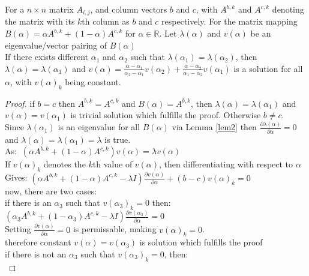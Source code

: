 \begin{Theorem}\label{th:3}
For a $n\times n$ matrix $A_{i,j}$, and column vectors $b$ and $c$, with $A^{b,k}$ and $A^{c,k}$ denoting the matrix with its $k$th column as $b$ and $c$ respectively. For the matrix mapping $B(\alpha) = \alpha A^{b,k} + (1-\alpha)A^{c,k}$ for $\alpha\in\mathbb{R}$. Let $\lambda(\alpha)$ and $v(\alpha)$ be an eigenvalue/vector pairing of $B(\alpha)$\\
If there exists different $\alpha_1$ and $\alpha_2$ such that $\lambda(\alpha_1)=\lambda(\alpha_2)$, then $\lambda(\alpha)=\lambda(\alpha_1)$ and $v(\alpha)=\frac{\alpha-\alpha_1}{\alpha_2-\alpha_1}v(\alpha_2)+\frac{\alpha-\alpha_2}{\alpha_1-\alpha_2}v(\alpha_1)$ is a solution for all $\alpha$, with $v(\alpha)_k$ being constant.
\end{Theorem}
\begin{proof}
if $b=c$ then $A^{b,k}=A^{c,k}$ and $B(\alpha) = A^{b,k}$, then $\lambda(\alpha)=\lambda(\alpha_1)$ and $v(\alpha)=v(\alpha_1)$ is trivial solution which fulfills the proof. Otherwise $b\ne c$.\\
Since $\lambda(\alpha_1)$ is an eigenvalue for all $B(\alpha)$ via Lemma \ref{lem2} then $\frac{\partial \lambda(\alpha)}{\partial \alpha}=0$ and $\lambda(\alpha)=\lambda(\alpha_1)=\lambda$ is true.\\
As: $~\left(\alpha A^{b,k} + (1-\alpha)A^{c,k}\right)v(\alpha)=\lambda v(\alpha)$\\
If $v(\alpha)_k$ denotes the $k$th value of $v(\alpha)$, then differentiating with respect to $\alpha$ \\
Gives: $\left(\alpha A^{b,k} + (1-\alpha)A^{c,k} - \lambda I\right)\frac{\partial v(\alpha)}{\partial\alpha}+(b-c)v(\alpha)_k=0$\\
now, there are two cases:\\
if there is an $\alpha_3$ such that $v(\alpha_3)_k=0$ then:\\
\-\hspace{8mm}$\left(\alpha_3 A^{b,k} + (1-\alpha_3)A^{c,k} - \lambda I\right)\frac{\partial v(\alpha_3)}{\partial\alpha}=0$\\
\-\hspace{8mm}Setting $\frac{\partial v(\alpha)}{\partial\alpha}=0$ is permissable, making $v(\alpha)_k=0$.\\
\-\hspace{8mm}therefore constant $v(\alpha)=v(\alpha_3)$ is solution which fulfills the proof\\
if there is not an $\alpha_3$ such that $v(\alpha_3)_k=0$, then:\\

\end{proof}
